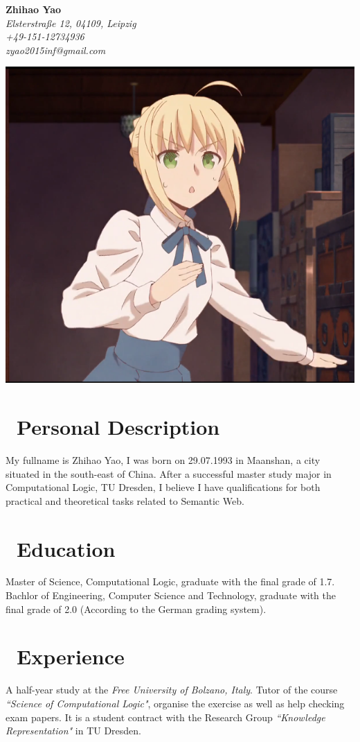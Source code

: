 \documentclass{my_cv}
\begin{document}
	\noindent
	\begin{minipage}[t]{.5\linewidth}
		\raggedright 
		\vspace{-2cm}
		{\bfseries \Huge Zhihao Yao}\\
		\small\itshape
		\faHome \hspace{1mm}  Elsterstraße 12, 04109, Leipzig\\
		\faMobilePhone\hspace{1mm} +49-151-12734936\\
		\faEnvelopeO \hspace{1mm} zyao2015inf@gmail.com\\
	\end{minipage}
	\begin{minipage}[t]{.5\linewidth}
		\raggedleft 
		\includegraphics[width=.4\linewidth]{saber_moe.png}
	\end{minipage}
	\section{\faMale\ Personal Description}
	My fullname is Zhihao Yao, I was born on 29.07.1993 in Maanshan, a city situated in the south-east of China. After a successful master study major in Computational Logic, TU Dresden, I believe I have qualifications for both practical and theoretical tasks related to Semantic Web.
	\section{\faGraduationCap\ Education}
	Master of Science, Computational Logic, graduate with the final grade of 1.7.
	Bachlor of Engineering, Computer Science and Technology, graduate with the final grade of 2.0 (According to the German grading system). 
	\section{\faBriefcase\ Experience}
	A half-year study at the {\itshape Free University of Bolzano, Italy}. 
	Tutor of the course {\itshape``Science of Computational Logic"}, organise the exercise as well as help checking exam papers. It is a student contract with the Research Group {\itshape``Knowledge Representation"} in TU Dresden.
\end{document}
